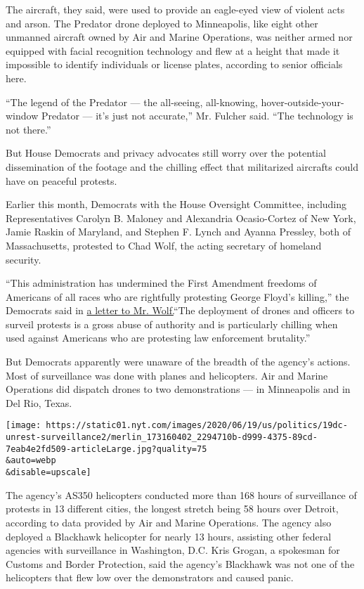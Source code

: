 The aircraft, they said, were used to provide an eagle-eyed view of
violent acts and arson. The Predator drone deployed to Minneapolis, like
eight other unmanned aircraft owned by Air and Marine Operations, was
neither armed nor equipped with facial recognition technology and flew
at a height that made it impossible to identify individuals or license
plates, according to senior officials here.

``The legend of the Predator --- the all-seeing, all-knowing,
hover-outside-your-window Predator --- it's just not accurate,'' Mr.
Fulcher said. ``The technology is not there.''

But House Democrats and privacy advocates still worry over the potential
dissemination of the footage and the chilling effect that militarized
aircrafts could have on peaceful protests.

Earlier this month, Democrats with the House Oversight Committee,
including Representatives Carolyn B. Maloney and Alexandria
Ocasio-Cortez of New York, Jamie Raskin of Maryland, and Stephen F.
Lynch and Ayanna Pressley, both of Massachusetts, protested to Chad
Wolf, the acting secretary of homeland security.

``This administration has undermined the First Amendment freedoms of
Americans of all races who are rightfully protesting George Floyd's
killing,'' the Democrats said in
\href{https://oversight.house.gov/sites/democrats.oversight.house.gov/files/2020-06-05.CBM\%20et.\%20al\%20to\%20Wolf-\%20DHS\%20re\%20Peaceful\%20Protestors_0.pdf}{a
letter to Mr. Wolf.}``The deployment of drones and officers to surveil
protests is a gross abuse of authority and is particularly chilling when
used against Americans who are protesting law enforcement brutality.''

But Democrats apparently were unaware of the breadth of the agency's
actions. Most of surveillance was done with planes and helicopters. Air
and Marine Operations did dispatch drones to two demonstrations --- in
Minneapolis and in Del Rio, Texas.

\texttt{[image: https://static01.nyt.com/images/2020/06/19/us/politics/19dc-unrest-surveillance2/merlin\_173160402\_2294710b-d999-4375-89cd-7eab4e2fd509-articleLarge.jpg?quality=75\\\&auto=webp\\\&disable=upscale]}

The agency's AS350 helicopters conducted more than 168 hours of
surveillance of protests in 13 different cities, the longest stretch
being 58 hours over Detroit, according to data provided by Air and
Marine Operations. The agency also deployed a Blackhawk helicopter for
nearly 13 hours, assisting other federal agencies with surveillance in
Washington, D.C. Kris Grogan, a spokesman for Customs and Border
Protection, said the agency's Blackhawk was not one of the helicopters
that flew low over the demonstrators and caused panic.

